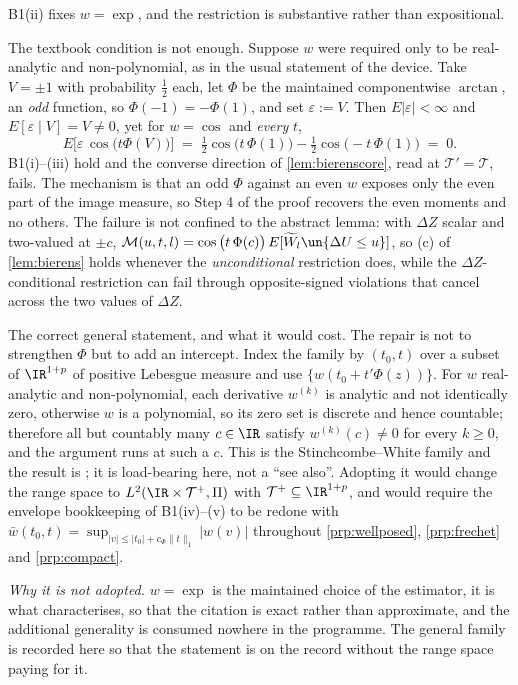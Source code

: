 \begin{remark}\label{rem:swintercept}
B1(ii) fixes $w=\exp$, and the restriction is substantive rather than expositional.

The textbook condition is not enough. Suppose $w$ were required only to be real-analytic and
non-polynomial, as in the usual statement of the device. Take $V=\pm1$ with probability $\tfrac12$ each,
let $\Phi$ be the maintained componentwise $\arctan$, an \emph{odd} function, so
$\Phi(-1)=-\Phi(1)$, and set $\varepsilon:=V$. Then $E|\varepsilon|<\infty$ and
$E[\varepsilon\mid V]=V\neq0$, yet for $w=\cos$ and \emph{every} $t$,
\[
E\big[\varepsilon\,\cos\big(t\Phi(V)\big)\big]
\;=\;\tfrac12\cos\big(t\,\Phi(1)\big)-\tfrac12\cos\big(-t\,\Phi(1)\big)\;=\;0 .
\]
B1(i)--(iii) hold and the converse direction of \cref{lem:bierenscore}, read at
$\mathcal T'=\mathcal T$, fails. The mechanism is that an
odd $\Phi$ against an even $w$ exposes only the even part of the image measure, so Step 4 of the proof
recovers the even moments and no others. The failure is not confined to the abstract lemma: with
$\Delta Z$ scalar and two-valued at $\pm c$,
$\mathcal M(u,t,l)=\cos\big(t\,\Phi(c)\big)\,E[\widetilde W_l\un\{\Delta U\le u\}]$, so (c) of
\cref{lem:bierens} holds
whenever the \emph{unconditional} restriction does, while the $\Delta Z$-conditional restriction can fail
through opposite-signed violations that cancel across the two values of $\Delta Z$.

The correct general statement, and what it would cost. The repair is not to strengthen $\Phi$ but
to add an intercept. Index the family by $(t_0,t)$ over a subset of $\IR^{1+p}$ of positive Lebesgue
measure and use $\{w(t_0+t'\Phi(z))\}$. For $w$ real-analytic and non-polynomial, each derivative
$w^{(k)}$ is analytic and not identically zero, otherwise $w$ is a polynomial, so its zero set is
discrete and hence countable; therefore all but countably many $c\in\IR$ satisfy $w^{(k)}(c)\neq0$ for
every $k\ge0$, and the argument runs at such a $c$. This is the Stinchcombe--White family and the result
is \citet[Thm.~3.1]{stinchcombewhite1998}; it is load-bearing here, not a ``see also''. Adopting it
would change the range space to $L^{2}(\IR\times\mathcal T^{+},\Pi)$ with
$\mathcal T^{+}\subseteq\IR^{1+p}$, and would require the envelope bookkeeping of B1(iv)--(v) to be redone
with $\bar w(t_0,t)=\sup_{|v|\le|t_0|+c_\Phi\|t\|_1}|w(v)|$ throughout \cref{prp:wellposed},
\cref{prp:frechet} and \cref{prp:compact}.

\emph{Why it is not adopted.} $w=\exp$ is the maintained choice of the estimator, it is what
\citet[Thm.~1]{bierens1990} characterises, so that the citation is exact rather than approximate, 
and the additional generality is consumed nowhere in the programme. The general family is recorded here
so that the statement is on the record without the range space paying for it.
\end{remark}

